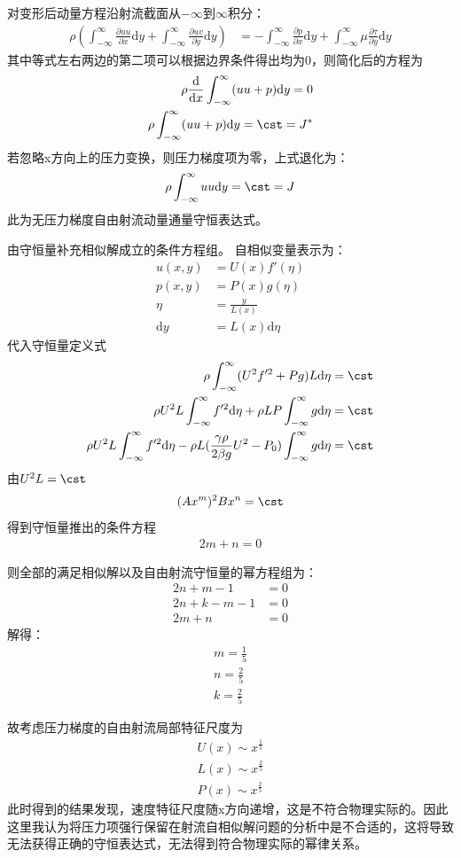 对变形后动量方程沿射流截面从$-\infty$到$\infty$积分：
\begin{align}
    \rho\left(\int_{-\infty}^{\infty}\frac{\partial uu}{\partial x}\mathrm{d}y+\int_{-\infty}^{\infty}\frac{\partial uv}{\partial y}\mathrm{d}y\right)&=-\int_{-\infty}^{\infty}\frac{\partial p}{\partial x}\mathrm{d}y+\int_{-\infty}^{\infty}\mu\frac{\partial \tau}{\partial y}\mathrm{d}y
\end{align}
其中等式左右两边的第二项可以根据边界条件得出均为0，则简化后的方程为
\begin{align}
    \rho\frac{\mathrm{d}}{\mathrm{d}x}\int_{-\infty}^{\infty}(uu+p)\mathrm{d}y=0\\
    \rho\int_{-\infty}^{\infty}(uu+p)\mathrm{d}y=\cst=J^{*}
\end{align}
若忽略x方向上的压力变换，则压力梯度项为零，上式退化为：
\begin{align}
     \rho\int_{-\infty}^{\infty}uu\mathrm{d}y=\cst=J
\end{align}
此为无压力梯度自由射流动量通量守恒表达式。

由守恒量补充相似解成立的条件方程组。  
自相似变量表示为：
\begin{align}
    u(x,y)&=U(x)f'(\eta)\\
    p(x,y)&=P(x)g(\eta)\\
    \eta&=\frac{y}{L(x)}\\
    \mathrm{d}y&=L(x)\mathrm{d}\eta
\end{align}
代入守恒量定义式
\begin{align}
    \rho\int_{-\infty}^{\infty}(U^{2}f'^{2}+Pg)L\mathrm{d}\eta=\cst\\
    \rho U^{2}L\int_{-\infty}^{\infty}f'^{2}\mathrm{d}\eta+\rho LP\int_{-\infty}^{\infty}g\mathrm{d}\eta=\cst\\
    \rho U^{2}L\int_{-\infty}^{\infty}f'^{2}\mathrm{d}\eta-\rho L(\frac{\gamma \rho}{2\beta g}U^{2}-P_{0})\int_{-\infty}^{\infty}g\mathrm{d}\eta=\cst
\end{align}
由$U^{2}L=\cst$
\begin{align}
    (Ax^{m})^{2}Bx^{n}=\cst
\end{align}
得到守恒量推出的条件方程
\begin{align}
    2m+n=0
\end{align}

则全部的满足相似解以及自由射流守恒量的幂方程组为：
\begin{align}
    2n+m-1&=0\\
    2n+k-m-1&=0\\
    2m+n&=0
\end{align}
解得：
\begin{align}
    m=\frac{1}{5}\\
    n=\frac{2}{5}\\
    k=\frac{2}{5}
\end{align}

故考虑压力梯度的自由射流局部特征尺度为
\begin{align}
    U(x)\sim x^{\frac{1}{5}}\\
    L(x)\sim x^{\frac{2}{5}}\\
    P(x)\sim x^{\frac{2}{5}}
\end{align}
此时得到的结果发现，速度特征尺度随x方向递增，这是不符合物理实际的。因此这里我认为将压力项强行保留在射流自相似解问题的分析中是不合适的，这将导致无法获得正确的守恒表达式，无法得到符合物理实际的幂律关系。